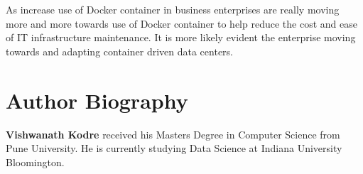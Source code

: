 \documentclass[9pt,twocolumn,twoside]{../../styles/osajnl}
\begin{document}
As increase use of Docker container in business enterprises are really moving more and more towards use of Docker container to help reduce the cost and ease of IT infrastructure maintenance. It is more likely evident the enterprise moving towards and adapting container driven data centers.



 
\section*{Author Biography}
\begingroup
\setlength\intextsep{0pt}
\begin{minipage}[t][3.2cm][t]{1.0\columnwidth} %
  \noindent
  {\bfseries Vishwanath Kodre} received his Masters Degree in Computer Science from Pune University.  He is currently studying Data Science at Indiana University Bloomington.
\end{minipage}
\endgroup
\end{document}
